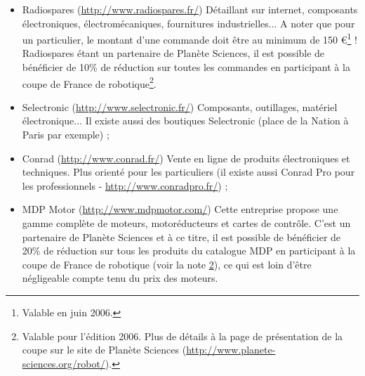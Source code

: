 \documentclass[a4paper]{article}
\begin{document}
\begin{itemize}
	\item Radiospares (\url{http://www.radiospares.fr/})
	\subitem Détaillant sur internet, composants électroniques, électromécaniques, fournitures industrielles... A noter que pour un particulier, le montant d'une commande doit être au minimum de 150 \euro{}\footnote{Valable en juin 2006.} ! Radiospares étant un partenaire de Planète Sciences, il est possible de bénéficier de 10\% de réduction sur toutes les commandes en participant à la coupe de France de robotique\footnote{\label{ReductionCoupe}Valable pour l'édition 2006. Plus de détails à la page de présentation de la coupe sur le site de Planète Sciences (\url{http://www.planete-sciences.org/robot/}).}.
	\item Selectronic (\url{http://www.selectronic.fr/})
	\subitem Composants, outillages, matériel électronique... Il existe aussi des boutiques Selectronic (place de la Nation à Paris par exemple) ;
	\item Conrad (\url{http://www.conrad.fr/})
	\subitem Vente en ligne de produits électroniques et techniques. Plus orienté pour les particuliers (il existe aussi Conrad Pro pour les professionnels - \url{http://www.conradpro.fr/}) ;
	\item MDP Motor (\url{http://www.mdpmotor.com/})
	\subitem Cette entreprise propose une gamme complète de moteurs, motoréducteurs et cartes de contrôle. C'est un partenaire de Planète Sciences et à ce titre, il est possible de bénéficier de 20\% de réduction sur tous les produits du catalogue MDP en participant à la coupe de France de robotique (voir la note \ref{ReductionCoupe}), ce qui est loin d'être négligeable compte tenu du prix des moteurs.
\end{itemize}


\newpage
\printglossary

\newpage






\end{document}
